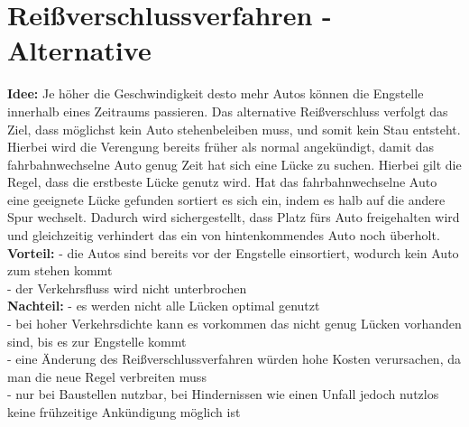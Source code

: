 \section{Reißverschlussverfahren - Alternative}
\textbf{Idee:} Je höher die Geschwindigkeit desto mehr Autos können die Engstelle innerhalb eines Zeitraums passieren. Das alternative Reißverschluss verfolgt das Ziel, dass möglichst kein Auto stehenbeleiben muss, und somit kein Stau entsteht. Hierbei wird die Verengung bereits früher als normal angekündigt, damit das fahrbahnwechselne Auto genug Zeit hat sich eine Lücke zu suchen. Hierbei gilt die Regel, dass die erstbeste Lücke genutz wird. Hat das fahrbahnwechselne Auto eine geeignete Lücke gefunden sortiert es sich ein, indem es halb auf die andere Spur wechselt. Dadurch wird sichergestellt, dass Platz fürs Auto freigehalten wird und gleichzeitig verhindert das ein von hintenkommendes Auto noch überholt. \\
\textbf{Vorteil:} - die Autos sind bereits vor der Engstelle einsortiert, wodurch kein Auto zum stehen kommt\\
- der Verkehrsfluss wird nicht unterbrochen\\
\textbf{Nachteil:} - es werden nicht alle Lücken optimal genutzt\\
- bei hoher Verkehrsdichte kann es vorkommen das nicht genug Lücken vorhanden sind, bis es zur Engstelle kommt\\
- eine Änderung des Reißverschlussverfahren würden hohe Kosten verursachen, da man die neue Regel verbreiten muss\\
- nur bei Baustellen nutzbar, bei Hindernissen wie einen Unfall jedoch nutzlos keine frühzeitige Ankündigung möglich ist\\